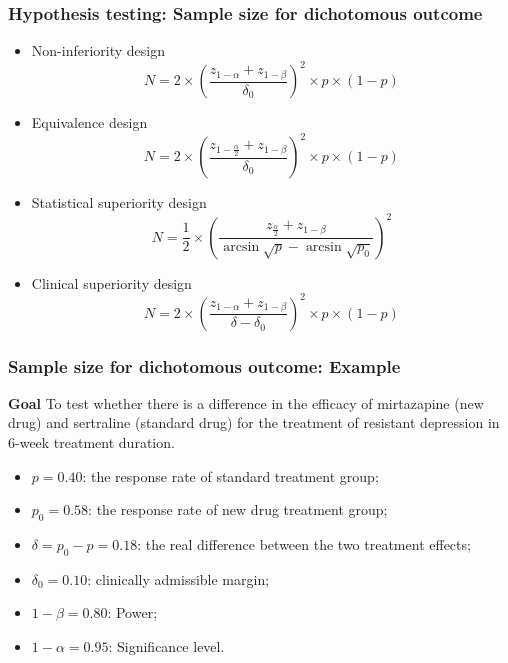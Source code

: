 \documentclass[table,10pt]{beamer}
\begin{document}
\begin{CJK*}{UTF8}{gbsn}
\begin{frame}[t]
\frametitle{Hypothesis testing: Sample size for dichotomous outcome}
\begin{itemize}
	\item<2-> \alert{Non-inferiority design}
	$$
N = 2 \times \left( \frac{z_{1-\alpha} + z_{1-\beta}}{\delta_0} \right)^2 \times p \times (1-p)
	$$
	\item<3-> \alert{Equivalence design}
	$$
N = 2 \times \left( \frac{z_{1-\frac{\alpha}{2}} + z_{1-\beta}}{\delta_0} \right)^2 \times p \times (1-p)
	$$
	\item<4-> \alert{Statistical superiority design}
	$$
N = \frac{1}{2} \times \left( \frac{z_{\frac{\alpha}{2}} + z_{1-\beta}}{\arcsin \sqrt{p} - \arcsin \sqrt{p_0}} \right)^2
	$$
	\item<5-> \alert{Clinical superiority design}
	$$
	N = 2 \times \left( \frac{z_{1-\alpha} + z_{1-\beta}}{\delta - \delta_0} \right)^2 \times p \times (1-p)
	$$
\end{itemize}
\end{frame}

\begin{frame}[t]
\frametitle{Sample size for dichotomous outcome: Example}
\textbf{Goal}
To test whether there is a difference in the efficacy of mirtazapine (new drug) 
and sertraline (standard drug) for the treatment of resistant depression in 
6-week treatment duration.
\begin{itemize}
	\item $p = 0.40$: the response rate of standard treatment group;
	\item $p_0 = 0.58$: the response rate of new drug treatment group;
	\item $\delta = p_0 - p = 0.18$: the real difference between the two treatment effects;
	\item $\delta_0 = 0.10$: clinically admissible margin;
	\item $1-\beta = 0.80$: Power;
	\item $1-\alpha = 0.95$: Significance level.
\end{itemize}

\end{frame}



\end{CJK*}
\end{document}
